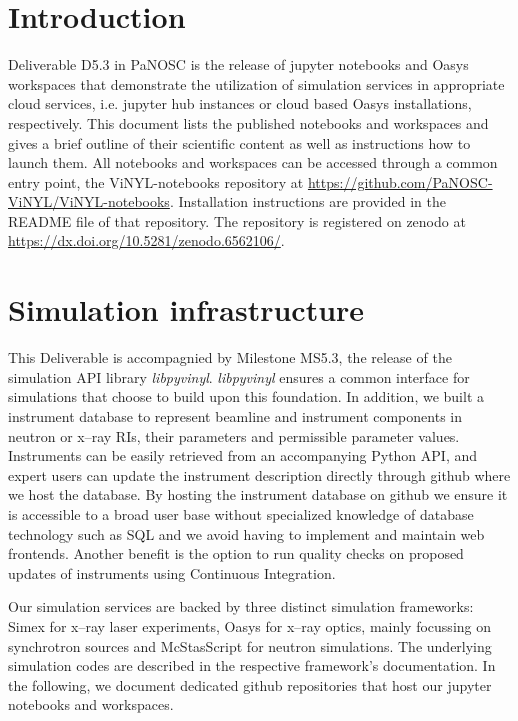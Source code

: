 \documentclass[10pt]{scrartcl}
\begin{document}
\section{Introduction}
\label{sec:introduction}
Deliverable D5.3 in PaNOSC is the release of jupyter notebooks and Oasys
workspaces
that demonstrate the utilization of simulation services in appropriate cloud
services, i.e. jupyter hub instances or cloud based Oasys installations,
respectively. This document lists the published notebooks and workspaces and
gives a brief outline of their scientific content as well as instructions how to
launch them. All notebooks and workspaces can be accessed through a common entry
point, the ViNYL-notebooks repository at
\url{https://github.com/PaNOSC-ViNYL/ViNYL-notebooks}. Installation instructions
are provided in the README file of that repository. The repository is registered
on zenodo at \url{https://dx.doi.org/10.5281/zenodo.6562106/}.

\section{Simulation infrastructure}
\label{sec:simulation_infrastructure}
This Deliverable is accompagnied by Milestone MS5.3, the release of the
simulation API library \textit{libpyvinyl}. \textit{libpyvinyl}
ensures a common interface for
simulations that choose to build upon this foundation. In addition, we built
a instrument database to represent beamline and instrument components in neutron
or x--ray RIs, their parameters and permissible parameter values.
Instruments can be easily retrieved from an
accompanying Python API, and expert users can update the instrument description
directly through github where we host the database. By hosting the instrument
database on github we ensure it is accessible to a broad user base without
specialized knowledge of database technology such as SQL and we avoid having to
implement and maintain web frontends. Another benefit is the
option to run quality checks on proposed updates of instruments using
Continuous Integration.

Our simulation services are backed by three distinct simulation frameworks:
Simex for x--ray laser experiments, Oasys for x--ray optics, mainly focussing on
synchrotron sources and McStasScript for neutron simulations. The underlying
simulation codes are described in the respective framework's documentation. In
the following, we document dedicated github repositories that host our jupyter
notebooks and workspaces.
\end{document}
